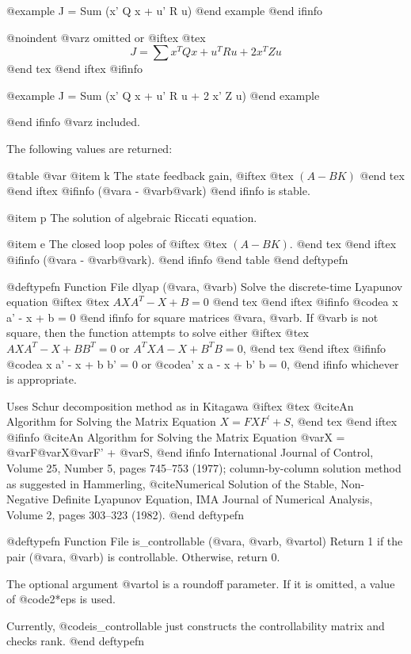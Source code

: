 @example
J = Sum (x' Q x + u' R u)
@end example
@end ifinfo

@noindent
@var{z} omitted or
@iftex
@tex
$$
 J = \sum x^T Q x + u^T R u + 2 x^T Z u
$$
@end tex
@end iftex
@ifinfo

@example
J = Sum (x' Q x + u' R u + 2 x' Z u)
@end example

@end ifinfo
@var{z} included.

The following values are returned:

@table @var
@item k
The state feedback gain,
@iftex
@tex
$(A - B K)$
@end tex
@end iftex
@ifinfo
(@var{a} - @var{b}@var{k})
@end ifinfo
is stable.

@item p
The solution of algebraic Riccati equation.

@item e
The closed loop poles of
@iftex
@tex
$(A - B K)$.
@end tex
@end iftex
@ifinfo
(@var{a} - @var{b}@var{k}).
@end ifinfo
@end table
@end deftypefn

@deftypefn {Function File} {} dlyap (@var{a}, @var{b})
Solve the discrete-time Lyapunov equation
@iftex
@tex
$AXA^T - X + B = 0$
@end tex
@end iftex
@ifinfo
@code{a x a' - x + b = 0}
@end ifinfo
for square matrices @var{a}, @var{b}.  If @var{b} is not square, then the
function attempts to solve either
@iftex
@tex
$AXA^T - X + B B^T = 0$ or $A^TXA - X + B^TB = 0$,
@end tex
@end iftex
@ifinfo
@code{a x a' - x + b b' = 0} or @code{a' x a - x + b' b = 0},
@end ifinfo
whichever is appropriate.

Uses Schur decomposition method as in Kitagawa 
@iftex
@tex
@cite{An Algorithm for Solving the Matrix Equation $X = F X F^\prime + S$},
@end tex
@end iftex
@ifinfo
@cite{An Algorithm for Solving the Matrix Equation @var{X} =
@var{F}@var{X}@var{F}' + @var{S}},
@end ifinfo
International Journal of Control, Volume 25, Number 5, pages 745--753
(1977); column-by-column solution method as suggested in
Hammerling, @cite{Numerical Solution of the Stable, Non-Negative
Definite Lyapunov Equation}, IMA Journal of Numerical Analysis, Volume
2, pages 303--323 (1982).
@end deftypefn

@deftypefn {Function File} {} is_controllable (@var{a}, @var{b}, @var{tol})
Return 1 if the pair (@var{a}, @var{b}) is controllable.  Otherwise,
return 0.

The optional argument @var{tol} is a roundoff parameter.  If it is
omitted, a value of @code{2*eps} is used.

Currently, @code{is_controllable} just constructs the controllability
matrix and checks rank.
@end deftypefn


